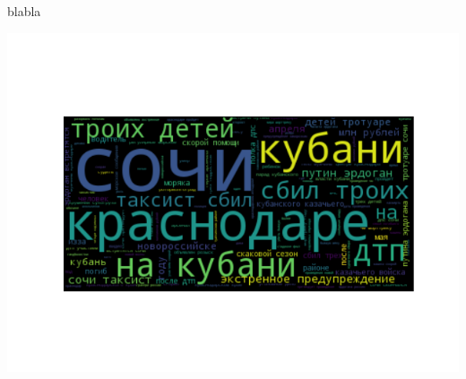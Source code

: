 \documentclass[a4paper,12pt]{article}
\begin{document}
blabla

\includegraphics{img.png}
\end{document}
